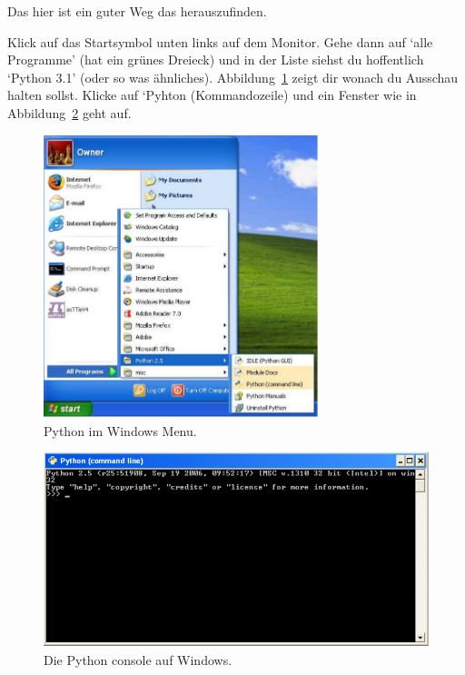 \noindent
Das hier ist ein guter Weg das herauszufinden.

\begin{WINDOWS}
Klick auf das Startsymbol unten links auf dem Monitor. Gehe dann auf `alle Programme' (hat ein grünes Dreieck) und in der Liste siehst du hoffentlich `Python 3.1' (oder so was ähnliches). Abbildung~\ref{fig1} zeigt dir wonach du Ausschau halten sollst. Klicke auf `Pyhton (Kommandozeile) und ein Fenster wie in Abbildung~\ref{fig2} geht auf.

\begin{figure}
\begin{center}
\includegraphics[width=80mm]{images/figure1}
\end{center}
\caption{Python im Windows Menu.}\label{fig1}
\end{figure}

\begin{figure}
\begin{center}
\includegraphics[width=135mm]{images/figure2}
\end{center}
\caption{Die Python console auf Windows.}\label{fig2}
\end{figure}
\end{WINDOWS}

